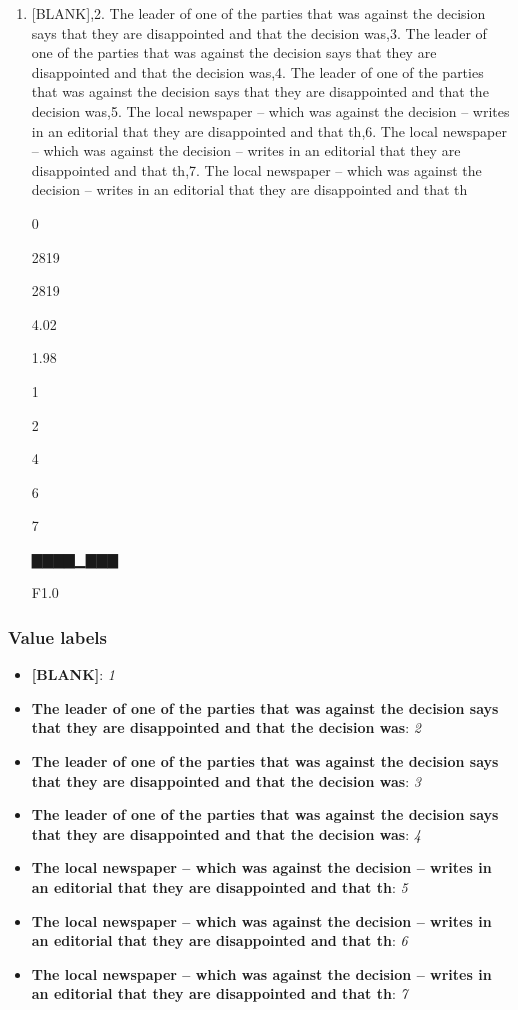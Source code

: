 \documentclass[]{book}
\providecommand{\tightlist}{%
  \setlength{\itemsep}{0pt}\setlength{\parskip}{0pt}}
\begin{document}
\begin{enumerate}
\def\labelenumi{\arabic{enumi}.}
\tightlist
\item
  {[}BLANK{]},2. The leader of one of the parties that was against the
  decision says that they are disappointed and that the decision was,3.
  The leader of one of the parties that was against the decision says
  that they are disappointed and that the decision was,4. The leader of
  one of the parties that was against the decision says that they are
  disappointed and that the decision was,5. The local newspaper -- which
  was against the decision -- writes in an editorial that they are
  disappointed and that th,6. The local newspaper -- which was against
  the decision -- writes in an editorial that they are disappointed and
  that th,7. The local newspaper -- which was against the decision --
  writes in an editorial that they are disappointed and that th

  0

  2819

  2819

  4.02

  1.98

  1

  2

  4

  6

  7

  ▇▇▇▇▁▇▇▇

  F1.0
\end{enumerate}

\subsubsection{Value labels}\label{r13pad5_avsender_labels}

\begin{itemize}
\tightlist
\item
  \textbf{{[}BLANK{]}}: \emph{1}
\item
  \textbf{The leader of one of the parties that was against the decision
  says that they are disappointed and that the decision was}: \emph{2}
\item
  \textbf{The leader of one of the parties that was against the decision
  says that they are disappointed and that the decision was}: \emph{3}
\item
  \textbf{The leader of one of the parties that was against the decision
  says that they are disappointed and that the decision was}: \emph{4}
\item
  \textbf{The local newspaper -- which was against the decision --
  writes in an editorial that they are disappointed and that th}:
  \emph{5}
\item
  \textbf{The local newspaper -- which was against the decision --
  writes in an editorial that they are disappointed and that th}:
  \emph{6}
\item
  \textbf{The local newspaper -- which was against the decision --
  writes in an editorial that they are disappointed and that th}:
  \emph{7}
\end{itemize}
\end{document}
